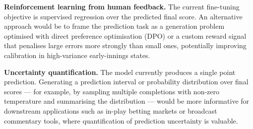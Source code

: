 \textbf{Reinforcement learning from human feedback.} The current fine-tuning objective is supervised regression over the predicted final score. An alternative approach would be to frame the prediction task as a generation problem optimised with direct preference optimisation (DPO) \cite{rafailov2023direct} or a custom reward signal that penalises large errors more strongly than small ones, potentially improving calibration in high-variance early-innings states.

\textbf{Uncertainty quantification.} The model currently produces a single point prediction. Generating a prediction interval or probability distribution over final scores --- for example, by sampling multiple completions with non-zero temperature and summarising the distribution --- would be more informative for downstream applications such as in-play betting markets or broadcast commentary tools, where quantification of prediction uncertainty is valuable.
